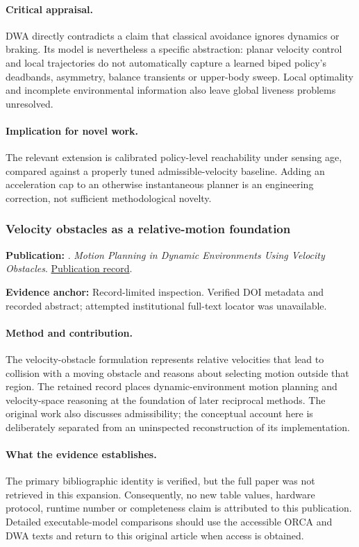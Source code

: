 \paragraph{Critical appraisal.} DWA directly contradicts a claim that classical avoidance ignores dynamics or braking. Its model is nevertheless a specific abstraction: planar velocity control and local trajectories do not automatically capture a learned biped policy's deadbands, asymmetry, balance transients or upper-body sweep. Local optimality and incomplete environmental information also leave global liveness problems unresolved.

\paragraph{Implication for novel work.} The relevant extension is calibrated policy-level reachability under sensing age, compared against a properly tuned admissible-velocity baseline. Adding an acceleration cap to an otherwise instantaneous planner is an engineering correction, not sufficient methodological novelty.

\subsubsection{Velocity obstacles as a relative-motion foundation}\label{paper:vo}
\textbf{Publication:} \citet{vo}. \emph{Motion Planning in Dynamic Environments Using Velocity Obstacles}. \href{https://doi.org/10.1177/027836499801700706}{Publication record}.

\textbf{Evidence anchor:} Record-limited inspection. Verified DOI metadata and recorded abstract; attempted institutional full-text locator was unavailable.

\paragraph{Method and contribution.} The velocity-obstacle formulation represents relative velocities that lead to collision with a moving obstacle and reasons about selecting motion outside that region. The retained record places dynamic-environment motion planning and velocity-space reasoning at the foundation of later reciprocal methods. The original work also discusses admissibility; the conceptual account here is deliberately separated from an uninspected reconstruction of its implementation.

\paragraph{What the evidence establishes.} The primary bibliographic identity is verified, but the full paper was not retrieved in this expansion. Consequently, no new table values, hardware protocol, runtime number or completeness claim is attributed to this publication. Detailed executable-model comparisons should use the accessible ORCA and DWA texts and return to this original article when access is obtained.


